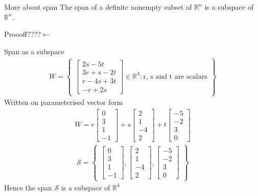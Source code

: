 \begin{theorem}{More about span}
The span of a definite nonempty subset of $\mathbb{R}^n$ is a subspace of $\mathbb{R}^n$.
\cite[231]{LiAl}
\end{theorem}
Proooff????$\leftarrow$

\begin{example}{Span as a subspace}
\begin{align*}
    W = \begin{Bmatrix}
    \begin{bmatrix}
    2s-5t\\3r+s-2t\\r-4s+3t\\-r+2s
    \end{bmatrix}
        \in \mathbb{R}^4:\text{r, s and t are scalars}
    \end{Bmatrix}
\end{align*}
Written on parameterised vector form
\begin{align*}
    W =
    r \begin{bmatrix}
        0 \\ 3 \\1 \\ -1
    \end{bmatrix}
    +s\begin{bmatrix}
        2 \\ 1 \\ -4 \\ 2
    \end{bmatrix}
    +t\begin{bmatrix}
        -5 \\ -2 \\ 3 \\ 0
    \end{bmatrix}
\end{align*}
\begin{align*}
    \mathcal{S}=
    \begin{Bmatrix}
    \begin{bmatrix}
        0 \\ 3 \\1 \\ -1
    \end{bmatrix}, 
    \begin{bmatrix}
        2 \\ 1 \\ -4 \\ 2
    \end{bmatrix},
    \begin{bmatrix}
        -5 \\ -2 \\ 3 \\ 0
    \end{bmatrix}
    \end{Bmatrix}
\end{align*}
Hence the span $\mathcal{S}$ is a subspace of $\mathbb{R}^4$
\end{example}

